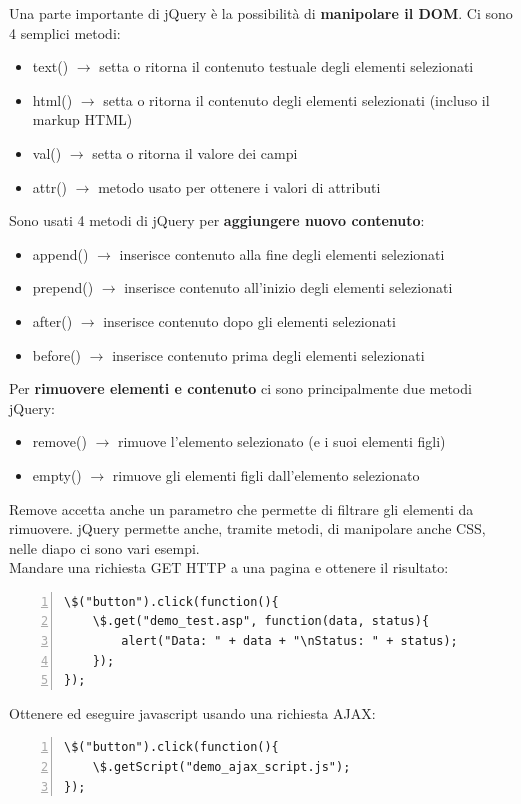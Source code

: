 Una parte importante di jQuery è la possibilità di \textbf{manipolare il DOM}. Ci sono 4 semplici metodi:
\begin{itemize}
    \item text() $\rightarrow$ setta o ritorna il contenuto testuale degli elementi selezionati
    \item html() $\rightarrow$ setta o ritorna il contenuto degli elementi selezionati (incluso il markup HTML)
    \item val() $\rightarrow$ setta o ritorna il valore dei campi
    \item attr() $\rightarrow$ metodo usato per ottenere i valori di attributi
\end{itemize}
Sono usati 4 metodi di jQuery per \textbf{aggiungere nuovo contenuto}:
\begin{itemize}
    \item append() $\rightarrow$ inserisce contenuto alla fine degli elementi selezionati
    \item prepend() $\rightarrow$ inserisce contenuto all'inizio degli elementi selezionati
    \item after() $\rightarrow$ inserisce contenuto dopo gli elementi selezionati
    \item before() $\rightarrow$ inserisce contenuto prima degli elementi selezionati
\end{itemize}
Per \textbf{rimuovere elementi e contenuto} ci sono principalmente due metodi jQuery:
\begin{itemize}
    \item remove() $\rightarrow$ rimuove l'elemento selezionato (e i suoi elementi figli)
    \item empty() $\rightarrow$ rimuove gli elementi figli dall'elemento selezionato
\end{itemize}
Remove accetta anche un parametro che permette di filtrare gli elementi da rimuovere. jQuery permette anche, tramite metodi, di manipolare anche CSS, nelle diapo ci sono vari esempi.\\

Mandare una richiesta GET HTTP a una pagina e ottenere il risultato:
\begin{Verbatim}[frame = single, numbers = left]
\$("button").click(function(){
    \$.get("demo_test.asp", function(data, status){
        alert("Data: " + data + "\nStatus: " + status);
    });
});
\end{Verbatim}
Ottenere ed eseguire javascript usando una richiesta AJAX:
\begin{Verbatim}[frame = single, numbers = left]
\$("button").click(function(){
    \$.getScript("demo_ajax_script.js");
});
\end{Verbatim}


